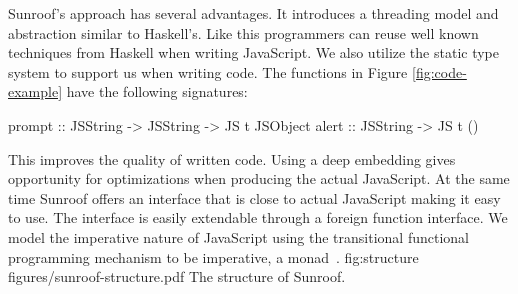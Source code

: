 Sunroof's approach has several advantages. 
It introduces a threading model and abstraction similar
to Haskell's. Like this programmers can reuse well known 
techniques from Haskell when writing JavaScript.
We also utilize the static type system to support us when 
writing code. The functions
in Figure \ref{fig:code-example} have the following signatures:
\begin{Code}
prompt :: JSString -> JSString -> JS t JSObject
alert  :: JSString -> JS t ()
\end{Code}
This improves the quality of written code.
Using a deep embedding gives opportunity 
for optimizations when producing the actual JavaScript.
At the same time Sunroof offers an interface that is 
close to actual JavaScript making it easy to use.
The interface is easily extendable through
a foreign function interface.
We model the imperative nature of JavaScript
using the transitional functional programming 
mechanism to be imperative, a monad~\cite{Moggi:91:ComputationMonads}.
\Figure%
{fig:structure}%
{figures/sunroof-structure.pdf}%
{The structure of Sunroof.}

